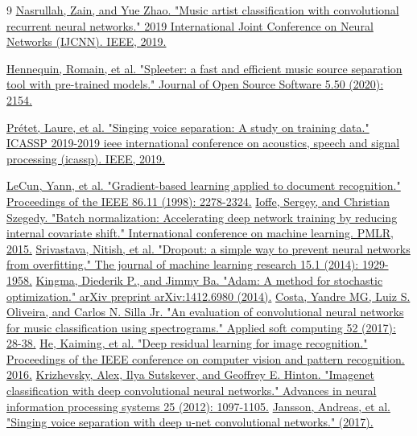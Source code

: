 \begin{thebibliography}{9}
    \href{https://arxiv.org/pdf/1901.04555.pdf}{Nasrullah, Zain, and Yue Zhao. "Music artist classification with convolutional recurrent neural networks." 2019 International Joint Conference on Neural Networks (IJCNN). IEEE, 2019.}

    \href{https://archives.ismir.net/ismir2019/latebreaking/000036.pdf}{Hennequin, Romain, et al. "Spleeter: a fast and efficient music source separation tool with pre-trained models." Journal of Open Source Software 5.50 (2020): 2154.}


    \href{https://arxiv.org/pdf/1906.02618.pdf}{Prétet, Laure, et al. "Singing voice separation: A study on training data." ICASSP 2019-2019 ieee international conference on acoustics, speech and signal processing (icassp). IEEE, 2019.}

    \href{http://www.iro.umontreal.ca/~lisa/bib/pub_subject/finance/pointeurs/lecun-98.pdf}{LeCun, Yann, et al. "Gradient-based learning applied to document recognition." Proceedings of the IEEE 86.11 (1998): 2278-2324.}
    \href{http://proceedings.mlr.press/v37/ioffe15.pdf}{Ioffe, Sergey, and Christian Szegedy. "Batch normalization: Accelerating deep network training by reducing internal covariate shift." International conference on machine learning. PMLR, 2015.}    
    \href{https://www.jmlr.org/papers/volume15/srivastava14a/srivastava14a.pdf?utm_campaign=buffer&utm_content=buffer79b43&utm_medium=social&utm_source=twitter.com}{Srivastava, Nitish, et al. "Dropout: a simple way to prevent neural networks from overfitting." The journal of machine learning research 15.1 (2014): 1929-1958.}
    \href{https://arxiv.org/pdf/1412.6980.pdf?source=post_page---------------------------}{Kingma, Diederik P., and Jimmy Ba. "Adam: A method for stochastic optimization." arXiv preprint arXiv:1412.6980 (2014).}
    \href{https://www.inf.ufpr.br/lesoliveira/download/ASOC2017.pdf}{Costa, Yandre MG, Luiz S. Oliveira, and Carlos N. Silla Jr. "An evaluation of convolutional neural networks for music classification using spectrograms." Applied soft computing 52 (2017): 28-38.}
    \href{https://arxiv.org/pdf/1512.03385.pdf}{He, Kaiming, et al. "Deep residual learning for image recognition." Proceedings of the IEEE conference on computer vision and pattern recognition. 2016.}
    \href{https://dl.acm.org/doi/pdf/10.1145/3065386}{Krizhevsky, Alex, Ilya Sutskever, and Geoffrey E. Hinton. "Imagenet classification with deep convolutional neural networks." Advances in neural information processing systems 25 (2012): 1097-1105.}
    \href{https://openaccess.city.ac.uk/id/eprint/19289/1/}{Jansson, Andreas, et al. "Singing voice separation with deep u-net convolutional networks." (2017).}


\end{thebibliography}

